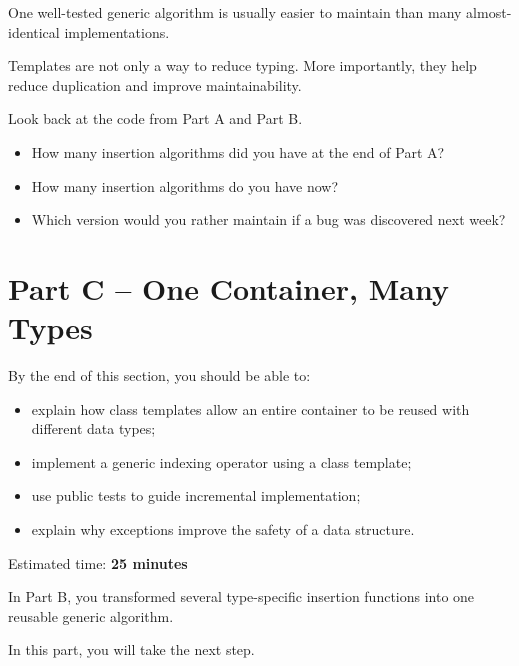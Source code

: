 \documentclass{csc2059practical}
\begin{document}
\begin{importantnote}
One well-tested generic algorithm is usually easier to maintain than many almost-identical implementations.

Templates are not only a way to reduce typing. More importantly, they help reduce duplication and improve maintainability.
\end{importantnote}

\begin{reflectionbox}
Look back at the code from Part A and Part B.

\begin{itemize}
    \item How many insertion algorithms did you have at the end of Part A?
    \item How many insertion algorithms do you have now?
    \item Which version would you rather maintain if a bug was discovered next week?
\end{itemize}
\end{reflectionbox}

\section{Part C -- One Container, Many Types}

\begin{learningoutcomes}
By the end of this section, you should be able to:
\begin{itemize}
    \item explain how class templates allow an entire container to be reused with different data types;
    \item implement a generic indexing operator using a class template;
    \item use public tests to guide incremental implementation;
    \item explain why exceptions improve the safety of a data structure.
\end{itemize}
\end{learningoutcomes}

\begin{infobox}
Estimated time: \textbf{25 minutes}
\end{infobox}

In Part B, you transformed several type-specific insertion functions into one reusable generic algorithm.

In this part, you will take the next step.
\end{document}
